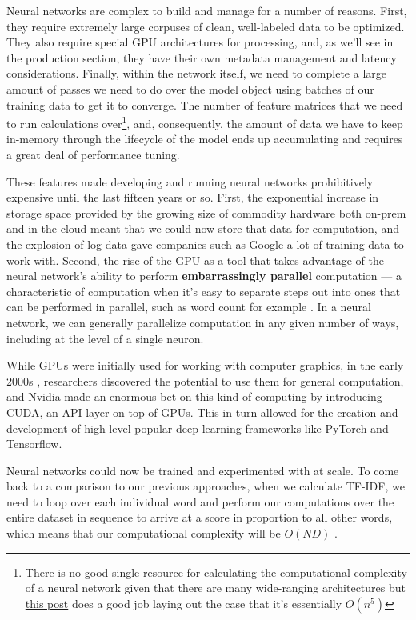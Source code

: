 \documentclass[11pt, table]{diazessay} %
\begin{document}
\begin{sloppypar}
Neural networks are complex to build and manage for a number of reasons. First, they require extremely large corpuses of clean, well-labeled data to be optimized. They also require special GPU architectures for processing, and, as we'll see in the production section, they have their own metadata management and latency considerations. Finally, within the network itself, we need to complete a large amount of passes we need to do over the model object using batches of our training data to get it to converge. The number of feature matrices that we need to run calculations over\footnote{There is no good single resource for calculating the computational complexity of a neural network given that there are many wide-ranging architectures but   \href{https://lunalux.io/computational-complexity-of-neural-networks/}{this post} does a good job laying out the case that it's essentially $O(n^5)$}, and, consequently, the amount of data we have to keep in-memory through the lifecycle of the model ends up accumulating and requires a great deal of performance tuning.

These features made developing and running neural networks prohibitively expensive until the last fifteen years or so. First, the exponential increase in storage space provided by the growing size of commodity hardware both on-prem and in the cloud meant that we could now store that data for computation, and  the explosion of log data gave companies such as Google a lot of training data to work with.  Second,  the rise of the GPU as a tool that takes advantage of the neural network's ability to perform \textbf{embarrassingly parallel} computation --- a characteristic of computation when it's easy to separate steps out into ones that can be performed in parallel, such as word count for example . In a neural network, we can generally parallelize computation in any given number of ways, including at the level of a single neuron.  

While GPUs were initially used for working with computer graphics, in the early 2000s \citep{oancea2014gpgpu}, researchers discovered the potential to use them for general computation, and Nvidia made an enormous bet on this kind of computing by introducing CUDA, an API layer on top of GPUs. This in turn allowed for the creation and development of high-level popular deep learning frameworks like PyTorch and Tensorflow.

Neural networks could now be trained and experimented with at scale. To come back to a comparison to our previous approaches, when we calculate TF-IDF, we need to loop over each individual word and perform our computations over the entire dataset in sequence to arrive at a score in proportion to all other words, which means that our computational complexity will be $O(N D)$ \citep{cong2016novel}.  


\end{sloppypar}
\end{document}

